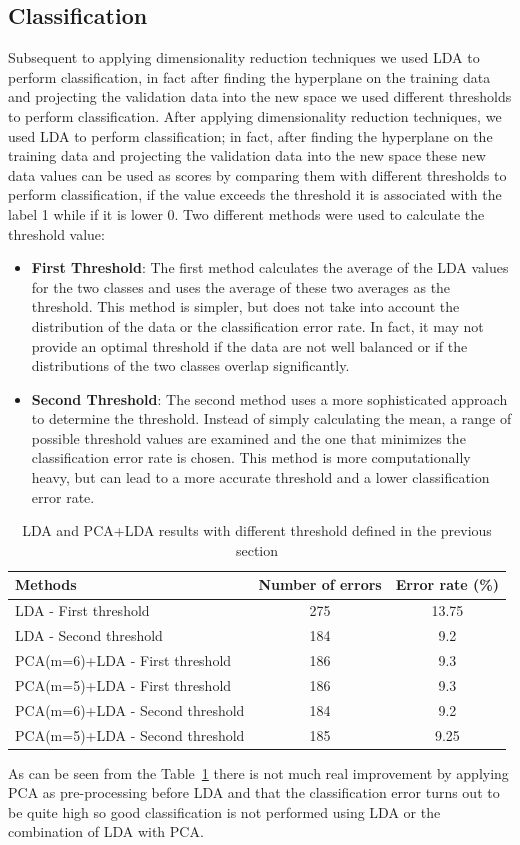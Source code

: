 \documentclass{article}
\begin{document}
\subsection{Classification}
Subsequent to applying dimensionality reduction techniques we used LDA to perform classification, in fact after finding the hyperplane on the training data and projecting the validation data into the new space we used different thresholds to perform classification.
After applying dimensionality reduction techniques, we used LDA to perform classification; in fact, after finding the hyperplane on the training data and projecting the validation data into the new space these new data values can be used as scores by comparing them with different thresholds to perform classification, if the value exceeds the threshold it is associated with the label 1 while if it is lower 0.
Two different methods were used to calculate the threshold value:
\begin{itemize}

\item \textbf{First Threshold}: The first method calculates the average of the LDA values for the two classes and uses the average of these two averages as the threshold. This method is simpler, but does not take into account the distribution of the data or the classification error rate. In fact, it may not provide an optimal threshold if the data are not well balanced or if the distributions of the two classes overlap significantly.
\item \textbf{Second Threshold}: The second method uses a more sophisticated approach to determine the threshold. Instead of simply calculating the mean, a range of possible threshold values are examined and the one that minimizes the classification error rate is chosen. This method is more computationally heavy, but can lead to a more accurate threshold and a lower classification error rate.  
\end{itemize}
\begin{table}[H]
    \centering
    \begin{tabular}{lcc}
    \hline
    \textbf{Methods} & \textbf{Number of errors} & \textbf{Error rate (\%)} \\
    \hline
    LDA - First threshold & 275 & 13.75 \\
    LDA - Second threshold & 184 & 9.2 \\
    \hline
    PCA(m=6)+LDA - First threshold & 186 & 9.3 \\
    PCA(m=5)+LDA - First threshold & 186 & 9.3 \\
    PCA(m=6)+LDA - Second threshold & 184 & 9.2 \\
    PCA(m=5)+LDA - Second threshold & 185 & 9.25 \\
    \hline
    \end{tabular}
    \caption{LDA and PCA+LDA results with different threshold defined in the previous section}
    \label{tab:resultsPCALDA}
\end{table}
As can be seen from the Table~\ref{tab:resultsPCALDA} there is not much real improvement by applying PCA as pre-processing before LDA and that the classification error turns out to be quite high so good classification is not performed using LDA or the combination of LDA with PCA.
\end{document}

